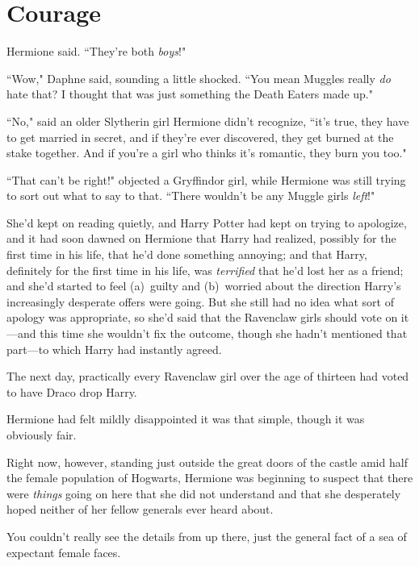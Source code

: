 \chapter{Courage}

 Hermione said. ``They're both \emph{boys}!"

\hplettrineextrapara
``Wow," Daphne said, sounding a little shocked. ``You mean Muggles really \emph{do} hate that? I thought that was just something the Death Eaters made up."

``No," said an older Slytherin girl Hermione didn't recognize, ``it's true, they have to get married in secret, and if they're ever discovered, they get burned at the stake together. And if you're a girl who thinks it's romantic, they burn you too."

``That can't be right!" objected a Gryffindor girl, while Hermione was still trying to sort out what to say to that. ``There wouldn't be any Muggle girls \emph{left}!"

She'd kept on reading quietly, and Harry Potter had kept on trying to apologize, and it had soon dawned on Hermione that Harry had realized, possibly for the first time in his life, that he'd done something annoying; and that Harry, definitely for the first time in his life, was \emph{terrified} that he'd lost her as a friend; and she'd started to feel (a)~guilty and (b)~worried about the direction Harry's increasingly desperate offers were going. But she still had no idea what sort of apology was appropriate, so she'd said that the Ravenclaw girls should vote on it---and this time she wouldn't fix the outcome, though she hadn't mentioned that part---to which Harry had instantly agreed.

The next day, practically every Ravenclaw girl over the age of thirteen had voted to have Draco drop Harry.

Hermione had felt mildly disappointed it was that simple, though it was obviously fair.

Right now, however, standing just outside the great doors of the castle amid half the female population of Hogwarts, Hermione was beginning to suspect that there were \emph{things} going on here that she did not understand and that she desperately hoped neither of her fellow generals ever heard about.

\later

You couldn't really see the details from up there, just the general fact of a sea of expectant female faces.

